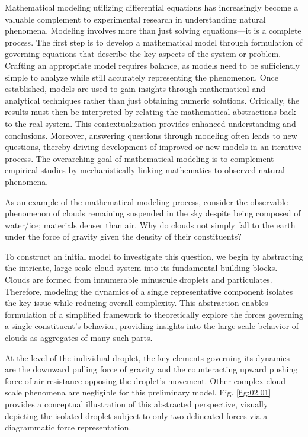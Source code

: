 Mathematical modeling utilizing differential equations has increasingly become a valuable complement to experimental research in understanding natural phenomena. Modeling involves more than just solving equations---it is a complete process. The first step is to develop a mathematical model through formulation of governing equations that describe the key aspects of the system or problem. Crafting an appropriate model requires balance, as models need to be sufficiently simple to analyze while still accurately representing the phenomenon. Once established, models are used to gain insights through mathematical and analytical techniques rather than just obtaining numeric solutions. Critically, the results must then be interpreted by relating the mathematical abstractions back to the real system. This contextualization provides enhanced understanding and conclusions. Moreover, answering questions through modeling often leads to new questions, thereby driving development of improved or new models in an iterative process. The overarching goal of mathematical modeling is to complement empirical studies by mechanistically linking mathematics to observed natural phenomena.

As an example of the mathematical modeling process, consider the observable phenomenon of clouds remaining suspended in the sky despite being composed of water/ice; materials denser than air. Why do clouds not simply fall to the earth under the force of gravity given the density of their constituents?

To construct an initial model to investigate this question, we begin by abstracting the intricate, large-scale cloud system into its fundamental building blocks. Clouds are formed from innumerable minuscule droplets and particulates. Therefore, modeling the dynamics of a single representative component isolates the key issue while reducing overall complexity. This abstraction enables formulation of a simplified framework to theoretically explore the forces governing a single constituent's behavior, providing insights into the large-scale behavior of clouds as aggregates of many such parts. 

At the level of the individual droplet, the key elements governing its dynamics are the downward pulling force of gravity and the counteracting upward pushing force of air resistance opposing the droplet's movement. Other complex cloud-scale phenomena are negligible for this preliminary model. Fig. \ref{fig:02.01} provides a conceptual illustration of this abstracted perspective, visually depicting the isolated droplet subject to only two delineated forces via a diagrammatic force representation.

